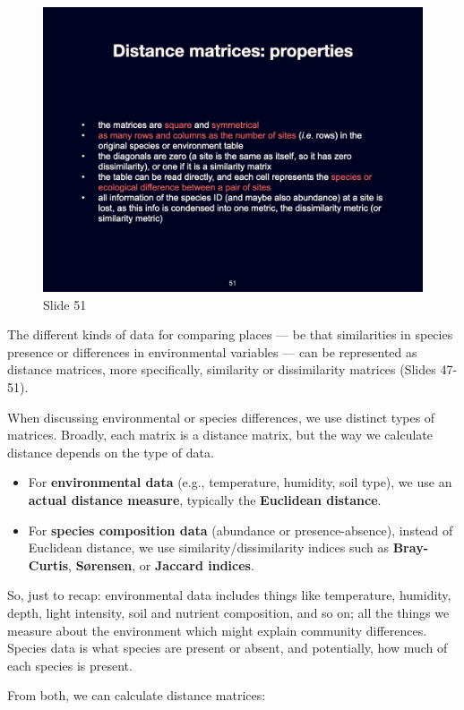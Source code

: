 \documentclass[
  10pt,
]{book}
\providecommand{\tightlist}{%
  \setlength{\itemsep}{0pt}\setlength{\parskip}{0pt}}
\begin{document}
\begin{figure}[ht]
\centering
\includegraphics[width=0.8\linewidth]{../images/BDC334/BDC334-051.jpeg}
\caption*{Slide 51}
\end{figure}

The different kinds of data for comparing places --- be that
similarities in species presence or differences in environmental
variables --- can be represented as distance matrices, more
specifically, similarity or dissimilarity matrices (Slides 47-51).

When discussing environmental or species differences, we use distinct
types of matrices. Broadly, each matrix is a distance matrix, but the
way we calculate distance depends on the type of data.

\begin{itemize}
\tightlist
\item
  For \textbf{environmental data} (e.g., temperature, humidity, soil
  type), we use an \textbf{actual distance measure}, typically the
  \textbf{Euclidean distance}.
\item
  For \textbf{species composition data} (abundance or presence-absence),
  instead of Euclidean distance, we use similarity/dissimilarity indices
  such as \textbf{Bray-Curtis}, \textbf{Sørensen}, or \textbf{Jaccard
  indices}.
\end{itemize}

So, just to recap: environmental data includes things like temperature,
humidity, depth, light intensity, soil and nutrient composition, and so
on; all the things we measure about the environment which might explain
community differences. Species data is what species are present or
absent, and potentially, how much of each species is present.

From both, we can calculate distance matrices:
\end{document}
